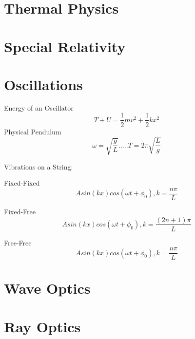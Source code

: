\documentclass{article}
\begin{document}
\section{Thermal Physics}









\section{Special Relativity}









\section{Oscillations}
Energy of an Oscillator\begin{equation}T+U=\frac{1}{2}mv^2 + \frac{1}{2}kx^2\end{equation}
Physical Pendulum\begin{equation}\omega = \sqrt{\frac{g}{L}}.....T=2\pi \sqrt{\frac{L}{g}}\end{equation}

Vibrations on a String:

Fixed-Fixed\begin{equation}Asin(kx)cos(\omega t + \phi_0), k = \frac{n\pi}{L}\end{equation}

Fixed-Free\begin{equation}Asin(kx)cos(\omega t+\phi_0), k = \frac{(2n+1)\pi}{L}\end{equation}

Free-Free\begin{equation}Asin(kx)cos(\omega t + \phi_0), k= \frac{n\pi}{L}\end{equation}


\section{Wave Optics}








\section{Ray Optics}
\end{document}
